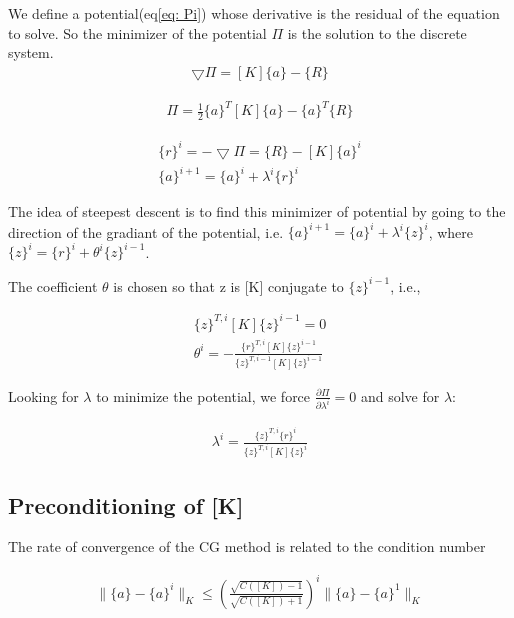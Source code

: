 \documentclass[paper=a4, fontsize=11pt]{article} %
\begin{document}
We define a potential(eq\ref{eq: Pi}) whose derivative is the residual of the equation to solve. So the minimizer of the potential $\Pi$ is the solution to the discrete system. 
\begin{eqnarray}
\bigtriangledown \Pi = [K]\{a\} - \{R\}
\end{eqnarray}

\begin{eqnarray}
\label{eq: Pi}
\Pi = \frac{1}{2} \{a\}^T [K] \{a\} - \{a\}^T\{R\}
\end{eqnarray}

\begin{eqnarray}
\label{eq: residual}
\{r\}^i = - \bigtriangledown \Pi = \{R\} - [K] \{a\}^i \nonumber\\
\{a\}^{i+1} = \{a\}^i + \lambda^i \{r\}^i
\end{eqnarray}

The idea of steepest descent is to find this minimizer of potential by going to the direction of the gradiant of the potential, i.e. $\{a\} ^{i+1} = \{a\} ^i + \lambda ^i \{z\} ^i $, where $\{z\}^i = \{r\}^i + \theta ^i\{z\}^{i-1}$.

The coefficient $\theta$ is chosen so that {z} is [K] conjugate to $\{z\}^{i-1}$, i.e.,

\begin{eqnarray}
\{z\}^{T, i} [K] \{z\} ^{i-1} =0 \nonumber\\
\theta^i = - \frac{\{r\}^{T,i} [K] \{z\} ^ {i-1}} {\{z\} ^{T,i-1} [K] \{z\}^{i-1} }
\end{eqnarray}

Looking for $\lambda$ to minimize the potential, we force $\frac{\partial {\Pi}}{\partial \lambda ^i} =0 $ and solve for $\lambda$:

\begin{eqnarray}
\lambda ^i = \frac{ \{z\}^{T,i} \{r\}^i} { \{z\}^{T,i}[K]\{z\}^i}
\end{eqnarray}

\subsection{Preconditioning of [K]}
The rate of convergence of the CG method is related to the condition number

\begin{eqnarray}
\| \{a\} - \{ a\}^i \| _K \leq (\frac{ \sqrt{C([K]) -1} }{ \sqrt{C([K]) + 1} }) ^i \| \{a\} - \{a\} ^1 \| _K
\end{eqnarray}
\end{document}
